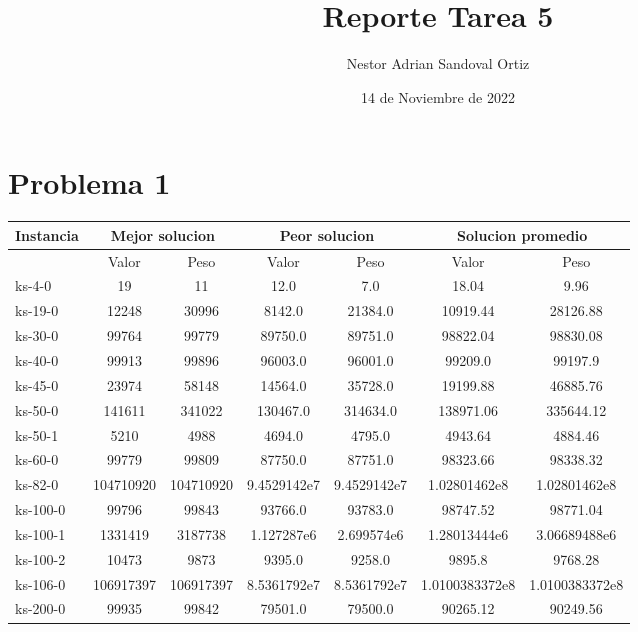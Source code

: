 \documentclass{report}
\title{Reporte Tarea 5}
\date{14 de Noviembre de 2022}
\author{Nestor Adrian Sandoval Ortiz}
\begin{document}
    \maketitle

    \chapter{Problema 1}

    \begin{tabular}{l|c|c|c|c|c|c}
        Instancia & \multicolumn{2}{|c|}{Mejor solucion} & \multicolumn{2}{|c|}{Peor solucion} & \multicolumn{2}{|c|}{Solucion promedio}\\
        \hline
        & Valor & Peso & Valor & Peso & Valor & Peso\\
        \hline
        ks-4-0 & 19 & 11 & 12.0 & 7.0 & 18.04 & 9.96\\
        \hline
        ks-19-0 & 12248 & 30996 & 8142.0 & 21384.0 & 10919.44 & 28126.88\\
        \hline
        ks-30-0 & 99764 & 99779 & 89750.0 & 89751.0 & 98822.04 & 98830.08\\
        \hline
        ks-40-0 & 99913 & 99896 & 96003.0 & 96001.0 & 99209.0 & 99197.9\\
        \hline
        ks-45-0 & 23974 & 58148 & 14564.0 & 35728.0 & 19199.88 & 46885.76\\
        \hline
        ks-50-0 & 141611 & 341022 & 130467.0 & 314634.0 & 138971.06 & 335644.12\\
        \hline
        ks-50-1 & 5210 & 4988 & 4694.0 & 4795.0 & 4943.64 & 4884.46\\
        \hline
        ks-60-0 & 99779 & 99809 & 87750.0 & 87751.0 & 98323.66 & 98338.32\\
        \hline
        ks-82-0 & 104710920 & 104710920 & 9.4529142e7 & 9.4529142e7 & 1.02801462e8 & 1.02801462e8\\
        \hline
        ks-100-0 & 99796 & 99843 & 93766.0 & 93783.0 & 98747.52 & 98771.04\\
        \hline
        ks-100-1 & 1331419 & 3187738 & 1.127287e6 & 2.699574e6 & 1.28013444e6 & 3.06689488e6\\
        \hline
        ks-100-2 & 10473 & 9873 & 9395.0 & 9258.0 & 9895.8 & 9768.28\\
        \hline
        ks-106-0 & 106917397 & 106917397 & 8.5361792e7 & 8.5361792e7 & 1.0100383372e8 & 1.0100383372e8\\
        \hline
        ks-200-0 & 99935 & 99842 & 79501.0 & 79500.0 & 90265.12 & 90249.56\\

\end{tabular}
\end{document}
